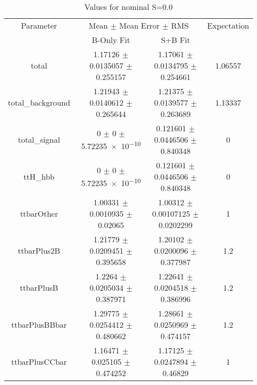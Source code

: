 \begin{table}
\centering
\caption{Values for nominal S=0.0}
\begin{tabular}{cccc}
\toprule
Parameter & \multicolumn{2}{c}{Mean $\pm$ Mean Error $\pm$ RMS} & Expectation\\
 & B-Only Fit & S+B Fit & \\
\midrule
total & \num{1.17126} $\pm$ \num{0.0135057} $\pm$ \num{0.255157} & \num{1.17061} $\pm$ \num{0.0134795} $\pm$ \num{0.254661} & \num{1.06557}\\
total\_background & \num{1.21943} $\pm$ \num{0.0140612} $\pm$ \num{0.265644} & \num{1.21375} $\pm$ \num{0.0139577} $\pm$ \num{0.263689} & \num{1.13337}\\
total\_signal & \num{0} $\pm$ \num{0} $\pm$ \num{5.72235e-10} & \num{0.121601} $\pm$ \num{0.0446506} $\pm$ \num{0.840348} & \num{0}\\
ttH\_hbb & \num{0} $\pm$ \num{0} $\pm$ \num{5.72235e-10} & \num{0.121601} $\pm$ \num{0.0446506} $\pm$ \num{0.840348} & \num{0}\\
ttbarOther & \num{1.00331} $\pm$ \num{0.0010935} $\pm$ \num{0.02065} & \num{1.00312} $\pm$ \num{0.00107125} $\pm$ \num{0.0202299} & \num{1}\\
ttbarPlus2B & \num{1.21779} $\pm$ \num{0.0209451} $\pm$ \num{0.395658} & \num{1.20102} $\pm$ \num{0.0200096} $\pm$ \num{0.377987} & \num{1.2}\\
ttbarPlusB & \num{1.2264} $\pm$ \num{0.0205034} $\pm$ \num{0.387971} & \num{1.22641} $\pm$ \num{0.0204518} $\pm$ \num{0.386996} & \num{1.2}\\
ttbarPlusBBbar & \num{1.29775} $\pm$ \num{0.0254412} $\pm$ \num{0.480662} & \num{1.28661} $\pm$ \num{0.0250969} $\pm$ \num{0.474157} & \num{1.2}\\
ttbarPlusCCbar & \num{1.16471} $\pm$ \num{0.025105} $\pm$ \num{0.474252} & \num{1.17125} $\pm$ \num{0.0247894} $\pm$ \num{0.46829} & \num{1}\\
\bottomrule
\end{tabular}
\end{table}